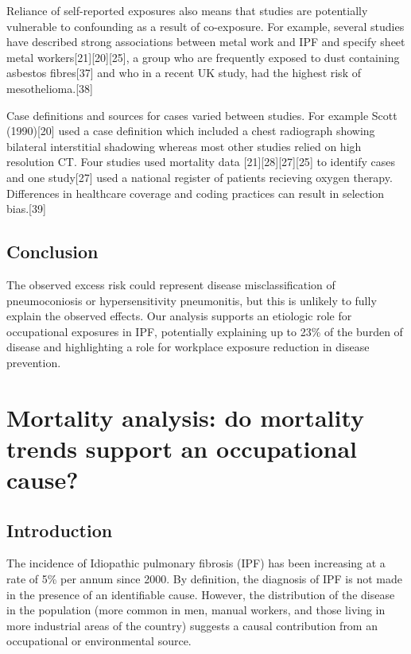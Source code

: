 \documentclass[12pt,a4paper,]{report}
\begin{document}
Reliance of self-reported exposures also means that studies are
potentially vulnerable to confounding as a result of co-exposure. For
example, several studies have described strong associations between
metal work and IPF and specify sheet metal
workers{[}21{]}{[}20{]}{[}25{]}, a group who are frequently exposed to
dust containing asbestos fibres{[}37{]} and who in a recent UK study,
had the highest risk of mesothelioma.{[}38{]}

Case definitions and sources for cases varied between studies. For
example Scott (1990){[}20{]} used a case definition which included a
chest radiograph showing bilateral interstitial shadowing whereas most
other studies relied on high resolution CT. Four studies used mortality
data {[}21{]}{[}28{]}{[}27{]}{[}25{]} to identify cases and one
study{[}27{]} used a national register of patients recieving oxygen
therapy. Differences in healthcare coverage and coding practices can
result in selection bias.{[}39{]}

\hypertarget{conclusion}{%
\section{Conclusion}\label{conclusion}}

The observed excess risk could represent disease misclassification of
pneumoconiosis or hypersensitivity pneumonitis, but this is unlikely to
fully explain the observed effects. Our analysis supports an etiologic
role for occupational exposures in IPF, potentially explaining up to
23\% of the burden of disease and highlighting a role for workplace
exposure reduction in disease prevention.

\hypertarget{mortality-analysis-do-mortality-trends-support-an-occupational-cause}{%
\chapter{Mortality analysis: do mortality trends support an occupational
cause?}\label{mortality-analysis-do-mortality-trends-support-an-occupational-cause}}

\hypertarget{introduction-1}{%
\section{Introduction}\label{introduction-1}}

The incidence of Idiopathic pulmonary fibrosis (IPF) has been increasing
at a rate of 5\% per annum since 2000. By definition, the diagnosis of
IPF is not made in the presence of an identifiable cause. However, the
distribution of the disease in the population (more common in men,
manual workers, and those living in more industrial areas of the
country) suggests a causal contribution from an occupational or
environmental source.
\end{document}
